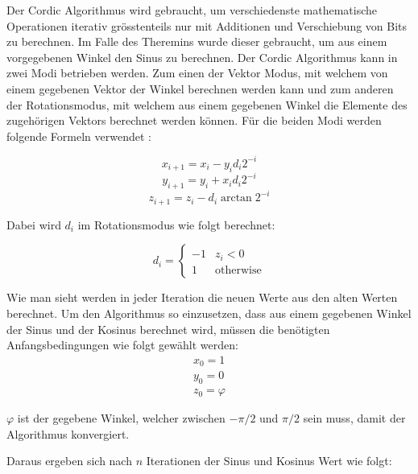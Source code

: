 Der Cordic Algorithmus wird gebraucht, um verschiedenste mathematische Operationen iterativ grösstenteils nur mit Additionen und Verschiebung von Bits zu berechnen. Im Falle des Theremins wurde dieser gebraucht, um aus einem vorgegebenen Winkel den Sinus zu berechnen.
Der Cordic Algorithmus kann in zwei Modi betrieben werden. Zum einen der Vektor Modus, mit welchem von einem gegebenen Vektor der Winkel berechnen werden kann und zum anderen der Rotationsmodus, mit welchem aus einem gegebenen Winkel die Elemente des zugehörigen Vektors berechnet werden können. Für die beiden Modi werden folgende Formeln verwendet \cite{Cordic}:

\begin{equation}
x_{i+1} = x_i - y_id_i2^{-i}
\label{equ:cordic_1}
\end{equation} 
\begin{equation}
y_{i+1} = y_i + x_id_i2^{-i}
\label{equ:cordic_2}
\end{equation} 
\begin{equation}
z_{i+1} = z_i - d_i\arctan{2^{-i}}
\label{equ:cordic_3}
\end{equation} 

Dabei wird \(d_i\) im Rotationsmodus wie folgt berechnet: 

\begin{equation}
d_i=
\begin{cases}
     -1 &z_i < 0 \\
     1 &\text{otherwise}
\end{cases}
\label{equ:cordic_4}
\end{equation} 

Wie man sieht werden in jeder Iteration die neuen Werte aus den alten Werten berechnet. Um den Algorithmus so einzusetzen, dass aus einem gegebenen Winkel der Sinus und der Kosinus berechnet wird, müssen die benötigten Anfangsbedingungen wie folgt gewählt werden:
\begin{equation}
\begin{aligned}
x_0 = 1 \\
y_0 = 0 \\
z_0 = \varphi
\end{aligned}
\label{equ:cordic_3}
\end{equation} 

\(\varphi\) ist der gegebene Winkel, welcher zwischen \(-\pi/2\) und \(\pi/2\) sein muss, damit der Algorithmus konvergiert.

Daraus ergeben sich nach \(n\) Iterationen der Sinus und Kosinus Wert wie folgt:

